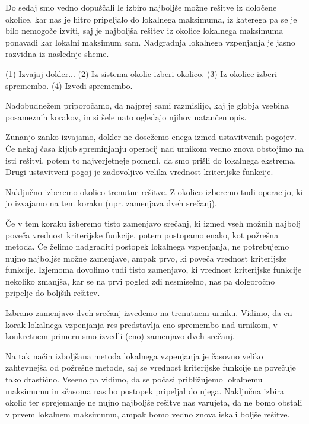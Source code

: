 \documentclass[a4paper,10pt]{article}
\begin{document}
Do sedaj smo vedno dopuščali le izbiro najboljše možne rešitve iz določene okolice, kar nas
je hitro pripeljalo do lokalnega maksimuma, iz katerega pa se je bilo nemogoče izviti, saj
je najboljša rešitev iz okolice lokalnega maksimuma ponavadi kar lokalni maksimum sam.
Nadgradnja lokalnega vzpenjanja je jasno razvidna iz naslednje sheme.

(1) Izvajaj dokler...
{
   (2) Iz sistema okolic izberi okolico.
   (3) Iz okolice izberi spremembo.
   (4) Izvedi spremembo.
}

Nadobudnežem priporočamo, da najprej sami razmislijo, kaj je globja vsebina posameznih
korakov, in si šele nato ogledajo njihov natančen opis.

   Zunanjo zanko izvajamo, dokler ne dosežemo enega izmed ustavitvenih pogojev.
   Če nekaj časa kljub spreminjanju operacij nad urnikom vedno znova obstojimo na isti
   rešitvi, potem to najverjetneje pomeni, da smo prišli do lokalnega ekstrema. Drugi
   ustavitveni pogoj je zadovoljivo velika vrednost kriterijske funkcije.

   Naključno izberemo okolico trenutne rešitve. Z okolico izberemo tudi operacijo,
   ki jo izvajamo na tem koraku (npr. zamenjava dveh srečanj).

   Če v tem koraku izberemo tisto zamenjavo srečanj, ki izmed vseh možnih najbolj
   poveča vrednost kriterijske funkcije, potem postopamo enako, kot požrešna metoda. Če
   želimo nadgraditi postopek lokalnega vzpenjanja, ne potrebujemo nujno najboljše možne
   zamenjave, ampak prvo, ki poveča vrednost kriterijske funkcije. Izjemoma dovolimo tudi
   tisto zamenjavo, ki vrednost kriterijske funkcije nekoliko zmanjša, kar se na prvi
   pogled zdi nesmiselno, nas pa dolgoročno pripelje do boljših rešitev.

   Izbrano zamenjavo dveh srečanj izvedemo na trenutnem urniku. Vidimo, da en korak
   lokalnega vzpenjanja res predstavlja eno spremembo nad urnikom, v konkretnem primeru
   smo izvedli (eno) zamenjavo dveh srečanj.

Na tak način izboljšana metoda lokalnega vzpenjanja je časovno veliko zahtevnejša od
požrešne metode, saj se vrednost kriterijske funkcije ne povečuje tako drastično. Vseeno
pa vidimo, da se počasi približujemo lokalnemu maksimumu in sčasoma nas bo postopek
pripeljal do njega. Naključna izbira okolic ter sprejemanje ne nujno najboljše rešitve
nas varujeta, da ne bomo obstali v prvem lokalnem maksimumu, ampak bomo vedno znova
iskali boljše rešitve.
\end{document}
